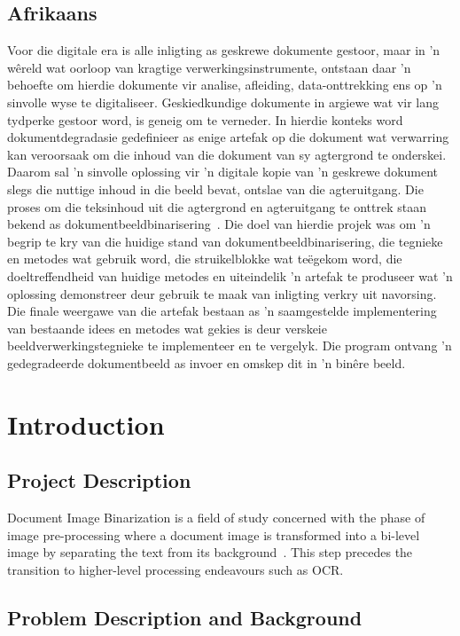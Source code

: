 \documentclass[a4paper, 12pt]{report}
\begin{document}
\section{Afrikaans}
Voor die digitale era is alle inligting as geskrewe dokumente gestoor, maar in 'n wêreld wat oorloop van kragtige verwerkingsinstrumente, ontstaan daar 'n behoefte om hierdie dokumente vir analise, afleiding, data-onttrekking ens op 'n sinvolle wyse te digitaliseer. Geskiedkundige dokumente in argiewe wat vir lang tydperke gestoor word, is geneig om te verneder. In hierdie konteks word dokumentdegradasie gedefinieer as enige artefak op die dokument wat verwarring kan veroorsaak om die inhoud van die dokument van sy agtergrond te onderskei. Daarom sal 'n sinvolle oplossing vir 'n digitale kopie van 'n geskrewe dokument slegs die nuttige inhoud in die beeld bevat, ontslae van die agteruitgang. Die proses om die teksinhoud uit die agtergrond en agteruitgang te onttrek staan bekend as dokumentbeeldbinarisering~\cite{su2012robust}. Die doel van hierdie projek was om 'n begrip te kry van die huidige stand van dokumentbeeldbinarisering, die tegnieke en metodes wat gebruik word, die struikelblokke wat teëgekom word, die doeltreffendheid van huidige metodes en uiteindelik 'n artefak te produseer wat 'n oplossing demonstreer deur gebruik te maak van inligting verkry uit navorsing. Die finale weergawe van die artefak bestaan as 'n saamgestelde implementering van bestaande idees en metodes wat gekies is deur verskeie beeldverwerkingstegnieke te implementeer en te vergelyk. Die program ontvang 'n gedegradeerde dokumentbeeld as invoer en omskep dit in 'n binêre beeld.

\chapter{Introduction}

\section{Project Description}
Document Image Binarization is a field of study concerned with the phase of image pre-processing where a document image is transformed into a bi-level image by separating the text from its background~\cite{su2012robust}. This step precedes the transition to higher-level processing endeavours such as OCR.

\section{Problem Description and Background}
\end{document}
